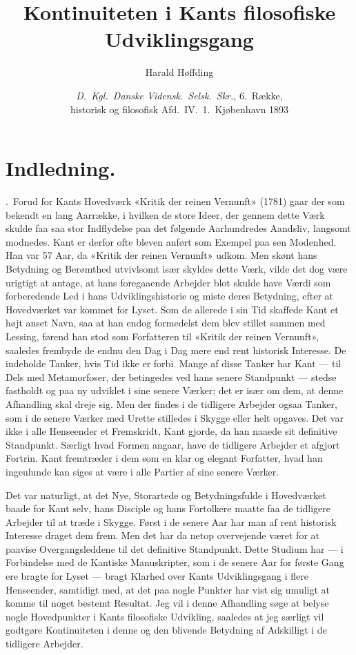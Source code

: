 \documentclass[12pt,a4paper]{article}
\title{\textbf{Kontinuiteten i Kants filosofiske Udviklingsgang}}
\author{Harald Høffding}
\date{\emph{D.\ Kgl.\ Danske Vidensk.\ Selsk.\ Skr.}, 6.\ Række,\\
  historisk og filosofisk Afd.\ IV.\ 1.\ Kjøbenhavn 1893}
\newcommand{\apage}[1]{\marginnote{\footnotesize\textit{[#1]}}}
\begin{document}
\maketitle
\thispagestyle{fancy}

\apage{5} \section*{Indledning.}

.\ Forud for Kants Hovedværk «Kritik der reinen Vernunft»
(1781) gaar der som bekendt en lang Aarrække, i hvilken de store Ideer,
der gennem dette Værk skulde faa saa stor Indflydelse paa det følgende
Aarhundredes Aandsliv, langsomt modnedes. Kant er derfor ofte bleven
anført som Exempel paa sen Modenhed. Han var 57 Aar, da «Kritik der
reinen Vernunft» udkom. Men skønt hans Betydning og Berømthed utvivlsomt
især skyldes dette Værk, vilde det dog være urigtigt at antage, at hans
foregaaende Arbejder blot skulde have Værdi som forberedende Led i hans
Udviklingshistorie og miste deres Betydning, efter at Hovedværket var
kommet for Lyset. Som de allerede i sin Tid skaffede Kant et højt anset
Navn, saa at han endog formedelst dem blev stillet sammen med Lessing,
førend han stod som Forfatteren til «Kritik der reinen Vernunft»,
saaledes frembyde de endnu den Dag i Dag mere end rent historisk
Interesse. De indeholde Tanker, hvis Tid ikke er forbi. Mange af disse
Tanker har Kant --- til Dels med Metamorfoser, der betingedes ved hans
senere Standpunkt --- stedse fastholdt og paa ny udviklet i sine senere
Værker; det er især om dem, at denne Afhandling skal dreje sig. Men der
findes i de tidligere Arbejder ogsaa Tanker, som i de senere Værker med
Urette stilledes i Skygge eller helt opgaves. Det var ikke i alle
Henseender et Fremskridt, Kant gjorde, da han naaede sit definitive
Standpunkt. Særligt hvad Formen angaar, have de tidligere Arbejder et
afgjort Fortrin. Kant fremtræder i dem som en klar og elegant Forfatter,
hvad han ingeulunde kan siges at være i alle Partier af sine senere
Værker.

Det var naturligt, at det Nye, Storartede og Betydningsfulde i
Hovedværket baade for Kant selv, hans Disciple og hans Fortolkere maatte
faa de tidligere Arbejder til at træde i Skygge. Først i de senere Aar
har man af rent historisk Interesse draget dem frem. Men det har da
netop overvejende været for at paavise Overgangsleddene til det
definitive Standpunkt. Dette Studium har --- i Forbindelse med de
Kantiske Manuskripter, som i de senere Aar for første Gang ere bragte
for Lyset --- bragt Klarhed over Kants Udviklingsgang i flere
Henseender, samtidigt med, at det paa nogle Punkter har vist sig \apage{6}  umuligt
at komme til noget bestemt Resultat. Jeg vil i denne Afhandling søge at
belyse nogle Hovedpunkter i Kants filosofiske Udvikling, saaledes at jeg
særligt vil godtgøre Kontinuiteten i denne og den blivende Betydning af
Adskilligt i de tidligere Arbejder.
\end{document}

